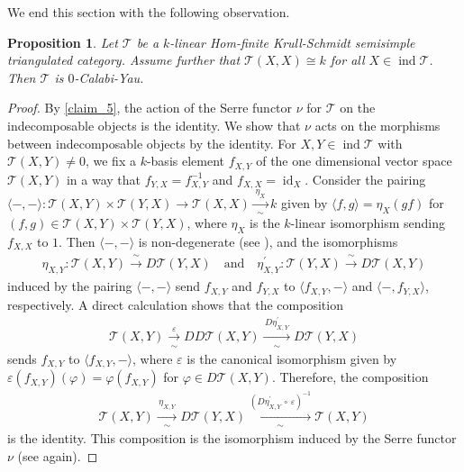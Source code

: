 \documentclass[12pt]{amsart}
\numberwithin{equation}{subsection}
\theoremstyle{plain}
\newtheorem{proposition}[theorem]{Proposition}
\theoremstyle{definition}
\newcommand{\id}{\operatorname{id}}
\newcommand{\ind}{\operatorname{ind}}
\newcommand{\T}{\mathcal{T}}
\begin{document}
We end this section with the following observation. 




\begin{proposition}\label{claim_12}
Let $\T$ be a $k$-linear Hom-finite Krull-Schmidt semisimple triangulated category.
Assume further that $\T(X, X) \cong k$ for all $X\in\ind\T$.
Then $\T$ is $0$-Calabi-Yau.
\end{proposition}
\begin{proof} 
By \cref{claim_5}, the action of the Serre functor $\nu$ for $\T$ on the indecomposable objects is the identity.
We show that $\nu$ acts on the morphisms between indecomposable objects by the identity.
For $X, Y \in\ind\T$ with $\T(X, Y)\neq 0$, we fix a $k$-basis element $f_{X, Y}$ of the one dimensional vector space $\T(X, Y)$ in a way that $f_{Y, X} = f_{X, Y}^{-1}$ and  $f_{X, X} = \id_X$. 
Consider the pairing $\langle-,-\rangle:\T(X, Y)\times\T(Y, X) \to \T(X, X) \xrightarrow[\sim]{\,\eta_X\,} k$ given by $\langle f, g \rangle = \eta_X(gf)$ for  $(f, g) \in \T(X, Y)\times\T(Y, X)$, where $\eta_X$ is the $k$-linear isomorphism sending $f_{X, X}$ to $1$.
Then $\langle-,-\rangle$ is non-degenerate (see \cite[Lemma 6.3.1]{Krause_book}), and the isomorphisms
\begin{align}
    \eta_{X, Y}:\T(X, Y) \xrightarrow{\,\sim\,} D\T(Y, X) 
    \quad\text{and}\quad
    \eta_{X, Y}^\prime:\T(Y, X) \xrightarrow{\,\sim\,} D\T(X, Y) 
\end{align}
induced by the pairing $\langle-,-\rangle$ send $f_{X, Y}$ and $f_{Y, X}$ to $\langle f_{X, Y},-\rangle$ and $\langle -, f_{Y, X}\rangle$, respectively.
A direct calculation shows that the composition 
\begin{align}
    \T(X, Y) \xrightarrow[\sim]{\,\varepsilon\,} DD\T(X, Y) \xrightarrow[\sim]{\,D\eta_{X, Y}^\prime\,} D\T(Y, X)  
\end{align}
sends $f_{X, Y}$ to $\langle f_{X, Y},-\rangle$, where $\varepsilon$ is the canonical isomorphism given by $\varepsilon(f_{X, Y})(\varphi) = \varphi(f_{X, Y})$ for $\varphi \in D\T(X, Y)$.
Therefore, the composition  
\begin{align}
    \T(X, Y) \xrightarrow[\sim]{\,\eta_{X, Y}\,} D\T(Y, X) \xrightarrow[\sim]{\left(D\eta_{X, Y}^\prime\,\circ\,\varepsilon\right)^{-1}} \T(X, Y)
\end{align}
is the identity.
This composition is  the isomorphism induced by the Serre functor $\nu $ (see \cite[Lemma 6.3.1]{Krause_book} again).
\end{proof}
\end{document}
